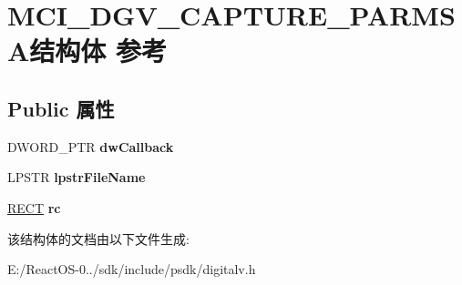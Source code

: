 \hypertarget{struct_m_c_i___d_g_v___c_a_p_t_u_r_e___p_a_r_m_s_a}{}\section{M\+C\+I\+\_\+\+D\+G\+V\+\_\+\+C\+A\+P\+T\+U\+R\+E\+\_\+\+P\+A\+R\+M\+S\+A结构体 参考}
\label{struct_m_c_i___d_g_v___c_a_p_t_u_r_e___p_a_r_m_s_a}
\subsection*{Public 属性}
\begin{DoxyCompactItemize}
\item 
\mbox{\label{struct_m_c_i___d_g_v___c_a_p_t_u_r_e___p_a_r_m_s_a_a3d3240e105043771a0aeef95a90c2411}} 
D\+W\+O\+R\+D\+\_\+\+P\+TR {\bfseries dw\+Callback}
\item 
\mbox{\label{struct_m_c_i___d_g_v___c_a_p_t_u_r_e___p_a_r_m_s_a_a24f83e9366c12d7c6dce3ce4a4256b2d}} 
L\+P\+S\+TR {\bfseries lpstr\+File\+Name}
\item 
\mbox{\label{struct_m_c_i___d_g_v___c_a_p_t_u_r_e___p_a_r_m_s_a_af8546b6cadc0b4cc231330b7361db707}} 
\hyperlink{structtag_r_e_c_t}{R\+E\+CT} {\bfseries rc}
\end{DoxyCompactItemize}


该结构体的文档由以下文件生成\+:\begin{DoxyCompactItemize}
\item 
E\+:/\+React\+O\+S-\/0../sdk/include/psdk/digitalv.\+h\end{DoxyCompactItemize}
